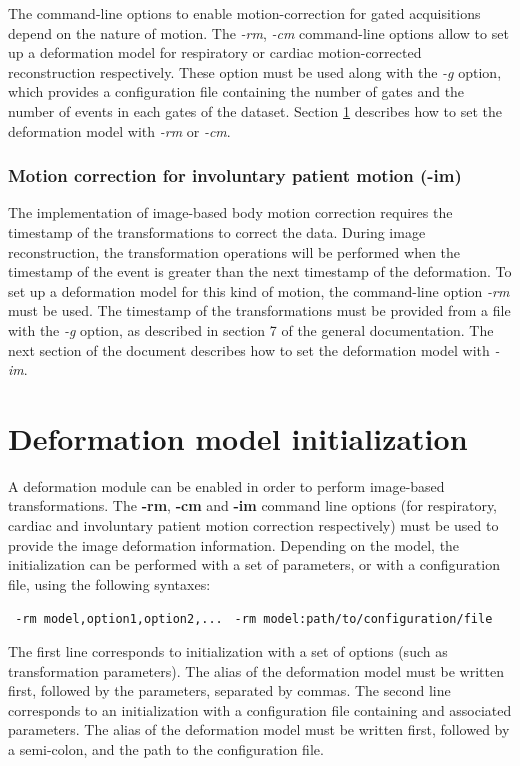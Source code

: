 \documentclass[a4paper, 11pt]{article}
\begin{document}
The command-line options to enable motion-correction for gated acquisitions depend on the nature of motion. The \textit{-rm}, \textit{-cm} command-line options allow to set up a deformation model for respiratory or cardiac motion-corrected reconstruction respectively. These option must be used along with the \textit{-g} option, which provides a configuration file containing the number of gates and the number of events in each gates of the dataset. Section \ref{s_deformation_init} describes how to set the deformation model with \textit{-rm} or \textit{-cm}.

\subsubsection{Motion correction for involuntary patient motion (-im)}

The implementation of image-based body motion correction requires the timestamp of the transformations to correct the data. During image reconstruction, the transformation operations will be performed when the timestamp of the event is greater than the next timestamp of the deformation. To set up a deformation model for this kind of motion, the command-line option \textit{-rm} must be used. The timestamp of the transformations must be provided from a file with 
the \textit{-g} option, as described in section 7 of the general documentation. The next section of the document describes how to set the deformation model with \textit{-im}.




\clearpage
\section{Deformation model initialization}
\label{s_deformation_init}

A deformation module can be enabled in order to perform image-based transformations. The \textbf{-rm}, \textbf{-cm} and \textbf{-im} command line options (for respiratory, cardiac and involuntary patient motion correction respectively) must be used to provide the image deformation information. Depending on the model, the initialization can be performed with a set of parameters, or with a configuration file, using the following syntaxes: 

\verb| -rm model,option1,option2,...|
\verb| -rm model:path/to/configuration/file|

The first line corresponds to initialization with a set of options (such as transformation parameters). The alias of the deformation model must be written first, followed by the parameters, separated by commas.
The second line corresponds to an initialization with a configuration file containing and associated parameters. The alias of the deformation model must be written first, followed by a semi-colon, and the path to the configuration file.
\end{document}

